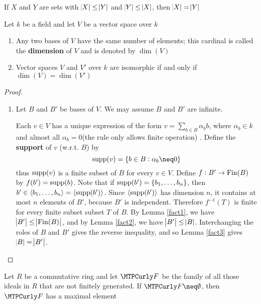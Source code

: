 \documentclass[11pt]{article}
\begin{document}
\begin{lemma}[]
\label{fact3}
If \(X\) and \(Y\) are sets with \(\abs{X}\le\abs{Y}\) and
\(\abs{Y}\le\abs{X}\), then \(\abs{X}=\abs{Y}\)
\end{lemma}

\begin{theorem}[]
Let \(k\) be a field and let \(V\) be a vector space over \(k\)
\begin{enumerate}
\item Any two bases of \(V\) have the same number of elements; this cardinal is
called the \textbf{dimension} of \(V\) and is denoted by \(\dim(V)\)
\item Vector spaces \(V\) and \(V'\) over \(k\) are isomorphic if and only if 
\(\dim(V)=\dim(V')\)
\end{enumerate}
\end{theorem}

\begin{proof}
\begin{enumerate}
\item Let \(B\) and \(B'\) be bases of \(V\). We may assume \(B\) and \(B'\) are infinite.

Each \(v\in V\) has a unique expression of the form 
\(v=\sum_{b\in B}\alpha_bb\), where \(\alpha_b\in k\) and almost all
\(\alpha_b=0\)(the rule only allows finite operation)
. Define the \textbf{support}
of \(v\) (w.r.t. \(B\)) by
\begin{equation*}
\supp(v)=\{b\in B:\alpha_b\neq0\}
\end{equation*}
thus \(\operatorname{supp}(v)\) is a finite subset of \(B\) for every \(v\in V\). Define 
\(f:B'\to\operatorname{Fin}(B)\) by \(f(b')=\operatorname{supp}(b)\). Note that if 
\(\operatorname{supp}(b')=\{b_1,\dots,b_n\}\), then \(b'\in\langle
      b_1,\dots,b_n\rangle=\langle\operatorname{supp}(b')\rangle\). Since \(\langle\operatorname{supp}(b')\rangle\) has
dimension \(n\), it contains at most \(n\) elements of \(B'\), because \(B'\) is
independent. Therefore \(f^{-1}(T)\) is finite for every finite subset
subset \(T\) of \(B\). By Lemma \ref{fact1}, we have
\(\abs{B'}\le\abs{\operatorname{Fin}(B)}\), and by Lemma \ref{fact2}, we have
\(\abs{B'}\le\abs{B}\). Interchanging the roles of \(B\) and \(B'\) gives the
reverse inequality, and so Lemma \ref{fact3} gives \(\abs{B}=\abs{B'}\).
\end{enumerate}
\end{proof}

\begin{lemma}[]
Let \(R\) be a commutative ring and let \(\calf\) be the family of all those
ideals in \(R\) that are not finitely generated. If \(\calf\neq\emptyset\), then
\(\calf\) has a maximal element
\end{lemma}
\end{document}
